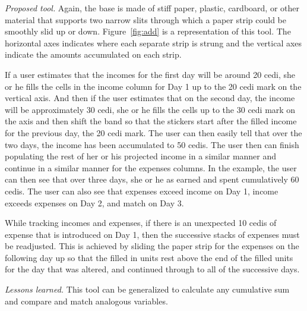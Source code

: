 \documentclass{sig-alternate}
\begin{document}
\emph{Proposed tool.} Again, the base is made of stiff paper, plastic, cardboard, or other material that supports two narrow slits through which a paper strip could be smoothly slid up or down. Figure~\ref{fig:add} is a representation of this tool. The horizontal axes indicates where each separate strip is strung and the vertical axes indicate the amounts accumulated on each strip.

If a user estimates that the incomes for the first day will be around 20 cedi, she or he fills the cells in the income column for Day 1 up to the 20 cedi mark on the vertical axis. And then if the user estimates that on the second day, the income will be approximately 30 cedi, she or he fills the cells up to the 30 cedi mark on the axis and then shift the band so that the stickers start after the filled income for the previous day, the 20 cedi mark. The user can then easily tell that over the two days, the income has been accumulated to 50 cedis. The user then can finish populating the rest of her or his projected income in a similar manner and continue in a similar manner for the expenses columns. In the example, the user can then see that over three days, she or he as earned and spent cumulatively 60 cedis. The user can also see that expenses exceed income on Day 1, income exceeds expenses on Day 2, and match on Day 3.

While tracking incomes and expenses, if there is an unexpected 10 cedis of expense that is introduced on Day 1, then the successive stacks of expenses must be readjusted. This is achieved by sliding the paper strip for the expenses on the following day up so that the filled in units rest above the end of the filled units for the day that was altered, and continued through to all of the successive days.

\emph{Lessons learned.} This tool can be generalized to calculate any cumulative sum and compare and match analogous variables.
\end{document}
